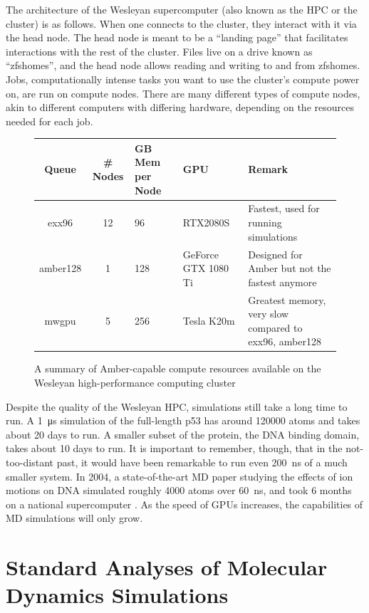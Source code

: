 The architecture of the Wesleyan supercomputer (also known as the HPC or the cluster) is as follows. When one connects to the cluster, they interact with it via the head node. The head node is meant to be a ``landing page'' that facilitates interactions with the rest of the cluster. Files live on a drive known as ``zfshomes'', and the head node allows reading and writing to and from zfshomes. Jobs, computationally intense tasks you want to use the cluster's compute power on, are run on compute nodes. There are many different types of compute nodes, akin to different computers with differing hardware, depending on the resources needed for each job.

\begin{figure}[htbp]
\centering
\begin{tabularx}{\textwidth}{|c|c|X|X|X|}
\hline
Queue & \# Nodes & GB Mem per Node & GPU & Remark \\
\hline
exx96 & 12 & 96 & RTX2080S & Fastest, used for running simulations \\
\hline
amber128 & 1 & 128 & GeForce GTX 1080 Ti & Designed for Amber but not the fastest anymore \\
\hline
mwgpu & 5 & 256 & Tesla K20m & Greatest memory, very slow compared to exx96, amber128 \\
\hline
\end{tabularx}
\caption[A Summary of Compute Resources]{A summary of Amber-capable compute resources available on the Wesleyan high-performance computing cluster}
\label{HPC nodes}
\end{figure}

Despite the quality of the Wesleyan HPC, simulations still take a long time to run. A \qty{1}{\micro\second} simulation of the full-length p53 has around \num{120000} atoms and takes about \num{20} days to run. A smaller subset of the protein, the DNA binding domain, takes about \num{10} days to run. It is important to remember, though, that in the not-too-distant past, it would have been remarkable to run even \qty{200}{\nano\second} of a much smaller system. In 2004, a state-of-the-art MD paper studying the effects of ion motions on DNA simulated roughly \num{4000} atoms over \qty{60}{\nano\second}, and took \num{6} months on a national supercomputer \parencite{ponomarevIonMotionsMolecular2004}. As the speed of GPUs increases, the capabilities of MD simulations will only grow.

\section{Standard Analyses of Molecular Dynamics Simulations}


